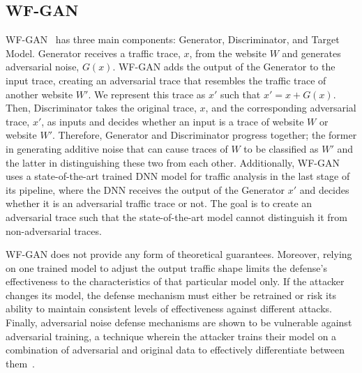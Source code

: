 \subsection{WF-GAN}\label{subsubsec:wf-gan}
WF-GAN~\cite{hou2020wf} has three main components: Generator, Discriminator, and Target Model.
Generator receives a traffic trace, $x$, from the website $W$ and generates adversarial noise, $G(x)$. 
WF-GAN adds the output of the Generator to the input trace, creating an adversarial trace that resembles the traffic trace of another website $W'$.
We represent this trace as $x'$ such that $x'=x + G(x)$.
Then, Discriminator takes the original trace, $x$, and the corresponding adversarial trace, $x'$, as inputs and decides whether an input is a trace of website $W$ or website $W'$.
Therefore, Generator and Discriminator progress together; the former in generating additive noise that can cause traces of $W$ to be classified as $W'$ and the latter in distinguishing these two from each other.
Additionally, WF-GAN uses a state-of-the-art trained DNN model for traffic analysis in the last stage of its pipeline, where the DNN receives the output of the Generator $x'$ and decides whether it is an adversarial traffic trace or not. 
The goal is to create an adversarial trace such that the state-of-the-art model cannot distinguish it from non-adversarial traces.

WF-GAN does not provide any form of theoretical guarantees. 
Moreover, relying on one trained model to adjust the output traffic shape limits the defense's effectiveness to the characteristics of that particular model only.
If the attacker changes its model, the defense mechanism must either be retrained or risk its ability to maintain consistent levels of effectiveness against different attacks.
Finally, adversarial noise defense mechanisms are shown to be vulnerable against adversarial training, a technique wherein the attacker trains their model on a combination of adversarial and original data to effectively differentiate between them~\cite{zhang2019statistical}.
